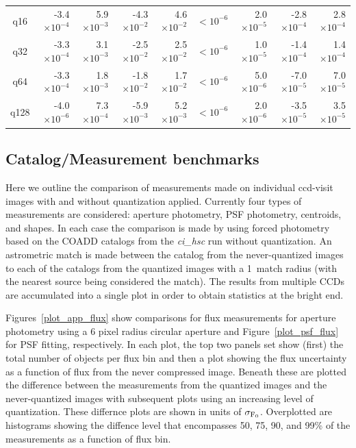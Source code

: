 \begin{table}
\begin{tabular}[]{crrrrrrrr}
  q16   & -3.4$\times 10^{-4}$ & 5.9$\times 10^{-3}$ & -4.3$\times 10^{-2}$ & 4.6$\times 10^{-2}$ & $<10^{-6}$ & 2.0$\times 10^{-5}$ & -2.8$\times 10^{-4}$ & 2.8$\times 10^{-4}$ \\
  q32   & -3.3$\times 10^{-4}$ & 3.1$\times 10^{-3}$ & -2.5$\times 10^{-2}$ & 2.5$\times 10^{-2}$ & $<10^{-6}$ & 1.0$\times 10^{-5}$ & -1.4$\times 10^{-4}$ & 1.4$\times 10^{-4}$ \\
  q64   & -3.3$\times 10^{-4}$ & 1.8$\times 10^{-3}$ & -1.8$\times 10^{-2}$ & 1.7$\times 10^{-2}$ & $<10^{-6}$ & 5.0$\times 10^{-6}$ & -7.0$\times 10^{-5}$ & 7.0$\times 10^{-5}$ \\
  q128  & -4.0$\times 10^{-6}$ & 7.3$\times 10^{-4}$ & -5.9$\times 10^{-3}$ & 5.2$\times 10^{-3}$ & $<10^{-6}$ & 2.0$\times 10^{-6}$ & -3.5$\times 10^{-5}$ & 3.5$\times 10^{-5}$ \\
\hline
\end{tabular}
\label{tab_agg_image_stat}
\end{table}





\subsection{Catalog/Measurement benchmarks}

Here we outline the comparison of measurements made on individual ccd-visit images with and without 
quantization applied.  Currently four types of measurements are considered: aperture photometry, 
PSF photometry, centroids, and shapes.  In each case the comparison is made by using forced 
photometry based on the COADD catalogs from the {\it ci\_hsc} run without quantization.
An astrometric match is made between the catalog from the never-quantized images to each of the
catalogs from the quantized images with a 1\arcsec\ match radius (with the nearest source being
considered the match).  The results from multiple CCDs are accumulated into a single plot in order
to obtain statistics at the bright end.

Figures~\ref{plot_app_flux} show comparisons for flux measurements for aperture photometry 
using a 6 pixel radius circular aperture and Figure~\ref{plot_psf_flux} for PSF fitting, respectively.
In each plot, the top two panels set show (first) the total number of objects 
per flux bin and then a plot showing the flux uncertainty as a function of flux from the never compressed image.  
Beneath these are plotted the difference between the measurements from the quantized images and the never-quantized 
images with subsequent plots using an increasing level of quantization.  These differnce plots are shown in units of
$\sigma_{\rm F_0}$.  Overplotted are histograms showing the diffence level that encompasses 50, 75, 90, and 99\% of the 
measurements as a function of flux bin.

